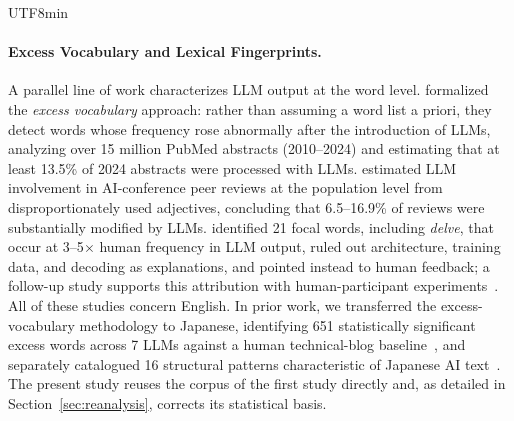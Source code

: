\documentclass[11pt,a4paper]{article}
\begin{document}
\begin{CJK}{UTF8}{min}
\paragraph{Excess Vocabulary and Lexical Fingerprints.}
A parallel line of work characterizes LLM output at the word level. \citet{kobak2025excess} formalized the \emph{excess vocabulary} approach: rather than assuming a word list a priori, they detect words whose frequency rose abnormally after the introduction of LLMs, analyzing over 15 million PubMed abstracts (2010--2024) and estimating that at least 13.5\% of 2024 abstracts were processed with LLMs.
\citet{liang2024monitoring} estimated LLM involvement in AI-conference peer reviews at the population level from disproportionately used adjectives, concluding that 6.5--16.9\% of reviews were substantially modified by LLMs. \citet{juzek2025delve} identified 21 focal words, including \textit{delve}, that occur at 3--5$\times$ human frequency in LLM output, ruled out architecture, training data, and decoding as explanations, and pointed instead to human feedback; a follow-up study supports this attribution with human-participant experiments~\citep{juzek2025overuse}. All of these studies concern English. In prior work, we transferred the excess-vocabulary methodology to Japanese, identifying 651 statistically significant excess words across 7 LLMs against a human technical-blog baseline~\citep{imoto2026excess}, and separately catalogued 16 structural patterns characteristic of Japanese AI text~\citep{imoto2025slop}. The present study reuses the corpus of the first study directly and, as detailed in Section~\ref{sec:reanalysis}, corrects its statistical basis.


\end{CJK}
\end{document}
